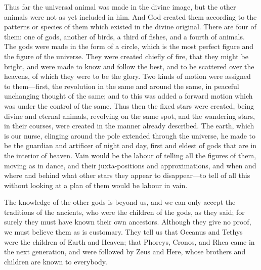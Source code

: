 \documentclass[11pt,letter]{article}
\begin{document}
\par  Thus far the universal animal was made in the divine image, but the other animals were not as yet included in him. And God created them according to the patterns or species of them which existed in the divine original. There are four of them: one of gods, another of birds, a third of fishes, and a fourth of animals. The gods were made in the form of a circle, which is the most perfect figure and the figure of the universe. They were created chiefly of fire, that they might be bright, and were made to know and follow the best, and to be scattered over the heavens, of which they were to be the glory. Two kinds of motion were assigned to them—first, the revolution in the same and around the same, in peaceful unchanging thought of the same; and to this was added a forward motion which was under the control of the same. Thus then the fixed stars were created, being divine and eternal animals, revolving on the same spot, and the wandering stars, in their courses, were created in the manner already described. The earth, which is our nurse, clinging around the pole extended through the universe, he made to be the guardian and artificer of night and day, first and eldest of gods that are in the interior of heaven. Vain would be the labour of telling all the figures of them, moving as in dance, and their juxta-positions and approximations, and when and where and behind what other stars they appear to disappear—to tell of all this without looking at a plan of them would be labour in vain.

\par  The knowledge of the other gods is beyond us, and we can only accept the traditions of the ancients, who were the children of the gods, as they said; for surely they must have known their own ancestors. Although they give no proof, we must believe them as is customary. They tell us that Oceanus and Tethys were the children of Earth and Heaven; that Phoreys, Cronos, and Rhea came in the next generation, and were followed by Zeus and Here, whose brothers and children are known to everybody.
\end{document}
